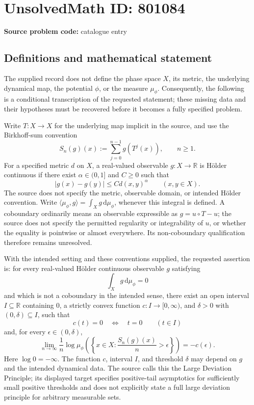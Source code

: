 \documentclass[11pt]{article}
\newcommand{\R}{\mathbb{R}}
\begin{document}
\section*{UnsolvedMath ID: 801084}
\textbf{Source problem code:} catalogue entry
\subsection{Definitions and mathematical statement}
The supplied record does not define the phase space \(X\), its metric, the underlying dynamical map, the potential \(\phi\), or the measure \(\mu_\phi\). Consequently, the following is a conditional transcription of the requested statement; these missing data and their hypotheses must be recovered before it becomes a fully specified problem.

Write \(T:X\to X\) for the underlying map implicit in the source, and use the Birkhoff-sum convention
\[
S_n(g)(x):=\sum_{j=0}^{n-1}g(T^j(x)),\qquad n\geq 1.
\]
For a specified metric \(d\) on \(X\), a real-valued observable \(g:X\to\R\) is H\"older continuous if there exist \(\alpha\in(0,1]\) and \(C\geq0\) such that
\[
|g(x)-g(y)|\leq C d(x,y)^\alpha\qquad(x,y\in X).
\]
The source does not specify the metric, observable domain, or intended H\"older convention. Write
\(\langle\mu_\phi,g\rangle=\int_X g\,\mathrm d\mu_\phi\), whenever this integral is defined. A coboundary ordinarily means an observable expressible as \(g=u\circ T-u\); the source does not specify the permitted regularity or integrability of \(u\), or whether the equality is pointwise or almost everywhere. Its non-coboundary qualification therefore remains unresolved.

With the intended setting and these conventions supplied, the requested assertion is: for every real-valued H\"older continuous observable \(g\) satisfying
\[
\int_X g\,\mathrm d\mu_\phi=0
\]
and which is not a coboundary in the intended sense, there exist an open interval \(I\subseteq\R\) containing \(0\), a strictly convex function \(c:I\to[0,\infty)\), and \(\delta>0\) with \((0,\delta)\subseteq I\), such that
\[
c(t)=0\quad\Longleftrightarrow\quad t=0\qquad(t\in I)
\]
and, for every \(\epsilon\in(0,\delta)\),
\[
\lim_{n\to\infty}\frac1n\log\mu_\phi\!\left(
\left\{x\in X:\frac{S_n(g)(x)}n>\epsilon\right\}
\right)=-c(\epsilon).
\]
Here \(\log0=-\infty\). The function \(c\), interval \(I\), and threshold \(\delta\) may depend on \(g\) and the intended dynamical data. The source calls this the Large Deviation Principle; its displayed target specifies positive-tail asymptotics for sufficiently small positive thresholds and does not explicitly state a full large deviation principle for arbitrary measurable sets.
\end{document}
